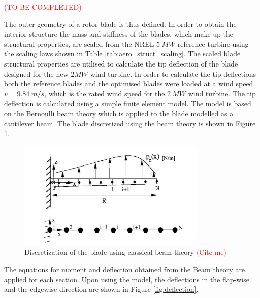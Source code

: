\textcolor{red}{(TO BE COMPLETED)}


The outer geometry of a rotor blade is thus defined. In order to obtain the interior structure the mass and stiffness of the blades, which make up the structural properties, are scaled from the NREL $5\ MW$ reference turbine using the scaling laws shown in Table \ref{tab:aero_struct_scaling}. The scaled blade structural properties are utilised to calculate the tip deflection of the blade designed for the new $2 MW$ wind turbine. In order to calculate the tip deflections both the reference blades and the optimised blades were loaded at a wind speed $v=9.84\ m/s$, which is the rated wind speed for the $2\ MW$ wind turbine. The tip deflection is calculated using a simple finite element model. The model is based on the Bernoulli beam theory which is applied to the blade modelled as a cantilever beam. The blade discretized using the beam theory is shown in Figure \ref{fig:beam_theory}.

\begin{figure}[H]
\centering
\includegraphics[width=0.8\textwidth]{Images/beam_theory.PNG} 
\caption{Discretization of the blade using classical beam theory \textcolor{red}{(Cite me)}}\label{fig:beam_theory}
\end{figure}

The equations for moment and deflection obtained from the Beam theory are applied for each section. Upon using the model, the deflections in the flap-wise and the edgewise direction are shown in Figure \ref{fig:deflection}.

